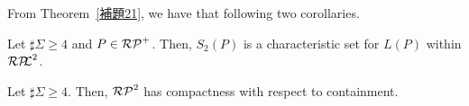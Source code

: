 From Theorem~\ref{補題21}, we have that following two corollaries.


\begin{col}
    Let $\sharp\Sigma \geq 4$ and $P \in \mathcal{RP}^{+}$.
    Then, $S_{2}(P)$ is a characteristic set for $L(P)$ within $\mathcal{RP\!\!L}^{2}$.
\end{col}


\begin{col}
    Let $\sharp\Sigma \geq 4$.
    Then, $\mathcal{RP}^{2}$ has compactness with respect to containment.
\end{col}
